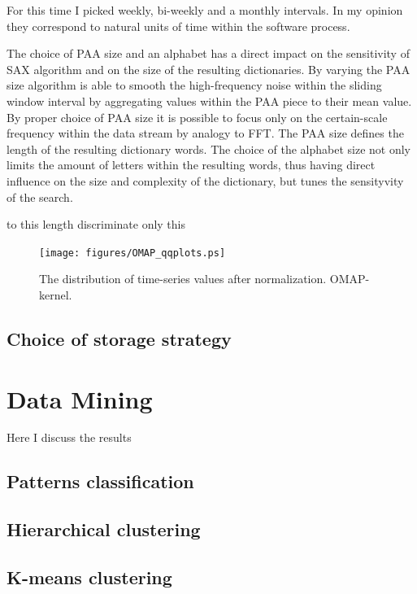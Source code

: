 \documentclass[a4paper,10pt]{article}
\numberwithin{equation}{subsection}
\begin{document}
For this time I picked weekly, bi-weekly and a monthly intervals. In my opinion they correspond to natural 
units of time within the software process. 

The choice of PAA size and an alphabet has a direct impact on the sensitivity of SAX algorithm and
on the size of the resulting dictionaries.
By varying the PAA size algorithm is able to smooth the high-frequency noise within the sliding window interval 
by aggregating values within the PAA piece to their mean value. By proper choice of PAA size it is possible to 
focus only on the certain-scale frequency within the data stream by analogy to FFT. The PAA size defines the length
of the resulting dictionary words. 
The choice of the alphabet size not only limits the amount of letters within the resulting words, thus having 
direct influence on the size and complexity of the dictionary, but tunes the sensityvity of the search.


to this length discriminate only this 

\begin{figure}[p]
   \centering
   \texttt{[image: figures/OMAP\_qqplots.ps]}
   \caption{The distribution of time-series values after normalization. OMAP-kernel.}
   \label{fig:qqplots}
\end{figure}


\subsection{Choice of storage strategy}


\section{Data Mining}\label{sec:third}
Here I discuss the results 

\subsection{Patterns classification}

\subsection{Hierarchical clustering}

\subsection{K-means clustering}
\end{document}
